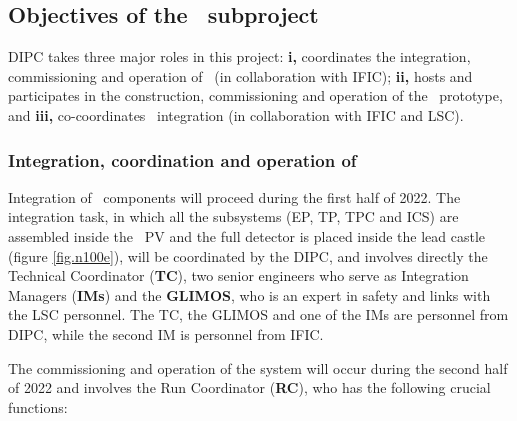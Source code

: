 \subsection{Objectives of the \sDIPC\ subproject}
\label{sec.obj.dipc}

DIPC takes three major roles in this project: {\bf i,} coordinates the integration, commissioning and operation of \Next\ (in collaboration with IFIC); 
{\bf ii,} hosts and participates in the construction, commissioning and operation of the \HDEMO\ prototype, and 
{\bf iii,} co-coordinates \NHD\ integration (in collaboration with IFIC and LSC). 

   
\subsubsection*{Integration, coordination and operation of \Next}


%

Integration of \Next\ components will proceed during the first half of 2022. The integration task, in which all the subsystems (EP, TP, TPC and ICS) are assembled inside the \Next\ PV and the full detector is placed inside the lead castle (figure \ref{fig.n100e}), will be coordinated by the DIPC, and involves directly the Technical Coordinator ({\bf TC}), two senior engineers who serve as Integration Managers ({\bf IMs}) and the {\bf GLIMOS}, who is an expert in safety and links with the LSC personnel. The TC, the GLIMOS and one of the IMs are personnel from DIPC, while the second IM is personnel from IFIC. 

The commissioning and operation of the system will occur during the second half of 2022 and involves the Run Coordinator ({\bf RC}), who has the following crucial functions: 



